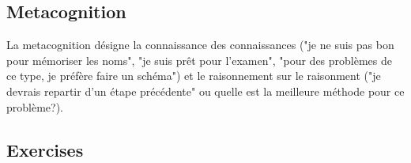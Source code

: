 \subsection{Metacognition}

La metacognition d\'esigne la connaissance des connaissances ("je ne suis pas bon pour m\'emoriser les noms", "je suis pr\^et pour l'examen", "pour des probl\`emes de ce type, je pr\'ef\`ere faire un sch\'ema") et le raisonnement sur le raisonment ("je devrais repartir d'un \'etape pr\'ec\'edente" ou quelle est la meilleure m\'ethode pour ce probl\`eme?).

\begin{figure}[H]
\centering
{}
\end{figure}


\subsection{Exercises}

\begin{figure}[H]
\centering
{}
\end{figure}
























